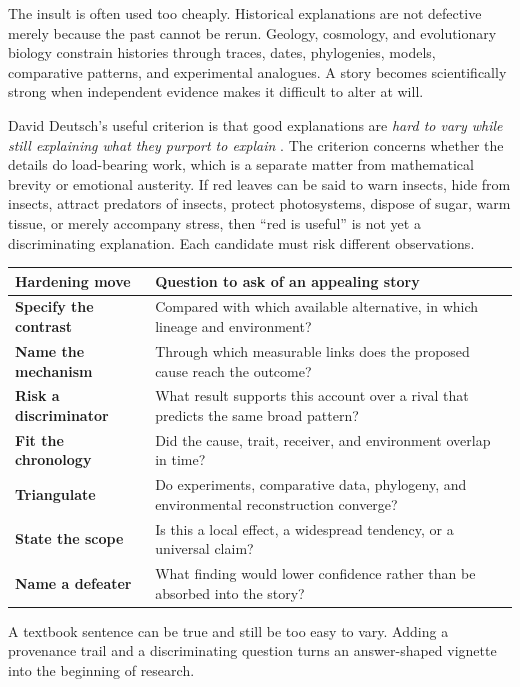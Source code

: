 The insult is often used too cheaply. Historical explanations are not defective merely because the past cannot be rerun. Geology, cosmology, and evolutionary biology constrain histories through traces, dates, phylogenies, models, comparative patterns, and experimental analogues. A story becomes scientifically strong when independent evidence makes it difficult to alter at will.

David Deutsch's useful criterion is that good explanations are \emph{hard to vary while still explaining what they purport to explain} \citep{deutsch2011}. The criterion concerns whether the details do load-bearing work, which is a separate matter from mathematical brevity or emotional austerity. If red leaves can be said to warn insects, hide from insects, attract predators of insects, protect photosystems, dispose of sugar, warm tissue, or merely accompany stress, then ``red is useful'' is not yet a discriminating explanation. Each candidate must risk different observations.

\begin{center}
\small
\renewcommand{\arraystretch}{1.24}
\begin{tabularx}{\linewidth}{>{\bfseries\color{night}}p{.22\linewidth}X}
\toprule
\textbf{Hardening move} & \textbf{Question to ask of an appealing story} \\
\midrule
Specify the contrast & Compared with which available alternative, in which lineage and environment? \\
Name the mechanism & Through which measurable links does the proposed cause reach the outcome? \\
Risk a discriminator & What result supports this account over a rival that predicts the same broad pattern? \\
Fit the chronology & Did the cause, trait, receiver, and environment overlap in time? \\
Triangulate & Do experiments, comparative data, phylogeny, and environmental reconstruction converge? \\
State the scope & Is this a local effect, a widespread tendency, or a universal claim? \\
Name a defeater & What finding would lower confidence rather than be absorbed into the story? \\
\bottomrule
\end{tabularx}
\end{center}

A textbook sentence can be true and still be too easy to vary. Adding a provenance trail and a discriminating question turns an answer-shaped vignette into the beginning of research.

